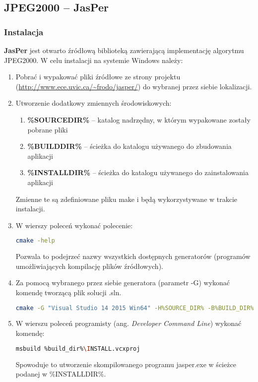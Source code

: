 \subsection{JPEG2000 -- JasPer}

\subsubsection{Instalacja}

\textbf{JasPer} jest otwarto źródłową biblioteką zawierającą implementację algorytmu JPEG2000. W celu instalacji na systemie Windows należy:

\begin{enumerate}
	\item Pobrać i wypakować pliki źródłowe ze strony projektu (\url{http://www.ece.uvic.ca/~frodo/jasper/}) do wybranej przez siebie lokalizacji.
	
	\item Utworzenie dodatkowy zmiennych środowiskowych:
	\begin{enumerate}
		\item \textbf{\%SOURCE\textunderscore DIR\%} -- katalog nadrzędny, w którym wypakowane zostały pobrane pliki
		\item \textbf{\%BUILD\textunderscore DIR\%} -- ścieżka do katalogu używanego do zbudowania aplikacji
		\item \textbf{\%INSTALL\textunderscore DIR\%} -- ścieżka do katalogu używanego do zainstalowania aplikacji
	\end{enumerate}
	Zmienne te są zdefiniowane pliku make i będą wykorzystywane w trakcie instalacji.
	
	\item W wierszy poleceń wykonać polecenie:
	
	\begin{lstlisting}[language=bash]
	cmake -help
	\end{lstlisting}
	
	Pozwala to podejrzeć nazwy wszystkich dostępnych generatorów (programów umożliwiających kompilację plików źródłowych).
	
	\item Za pomocą wybranego przez siebie generatora (parametr -G) wykonać komendę tworzącą plik solucji .sln.
	
	\begin{lstlisting}[language=bash]
	cmake -G "Visual Studio 14 2015 Win64" -H%SOURCE_DIR% -B%BUILD_DIR% ^ -DCMAKE_INSTALL_PREFIX=%INSTALL_DIR%
	\end{lstlisting}
	
	\item W wierszu poleceń programisty (ang. \textit{Developer Command Line}) wykonać komendę:
	
	\begin{lstlisting}[language=bash]
	msbuild %build_dir%\INSTALL.vcxproj
	\end{lstlisting}
	
	Spowoduje to utworzenie skompilowanego programu jasper.exe w ścieżce podanej w \%INSTALL\textunderscore DIR\%.
\end{enumerate}



